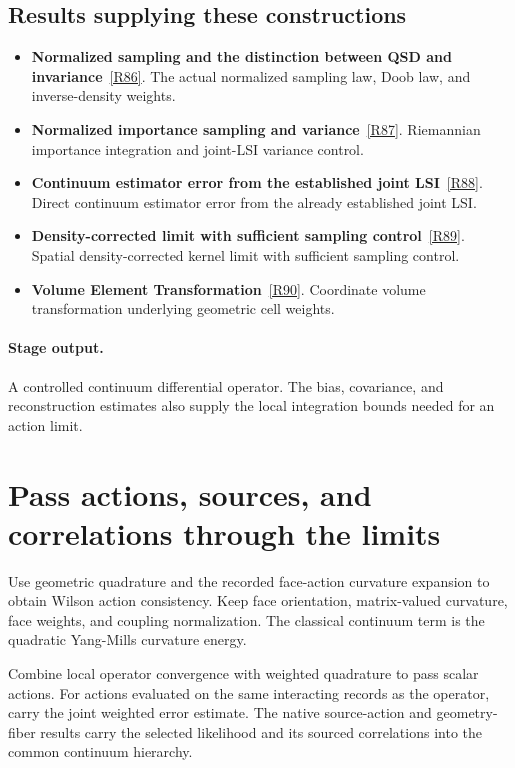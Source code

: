 \documentclass[11pt,a4paper]{article}
\begin{document}
\subsection*{Results supplying these constructions}
\begin{itemize}
\item \textbf{Normalized sampling and the distinction between QSD and invariance}~\hyperref[src:lem-continuum-a3-qsd-sampling]{[R86]}. The actual normalized sampling law, Doob law, and inverse-density weights.
\item \textbf{Normalized importance sampling and variance}~\hyperref[src:prop-monte-carlo-riemannian-latent]{[R87]}. Riemannian importance integration and joint-LSI variance control.
\item \textbf{Continuum estimator error from the established joint LSI}~\hyperref[src:cor-cst-inherited-lsi-consistency]{[R88]}. Direct continuum estimator error from the already established joint LSI.
\item \textbf{Density-corrected limit with sufficient sampling control}~\hyperref[src:prop-density-corrected-limit]{[R89]}. Spatial density-corrected kernel limit with sufficient sampling control.
\item \textbf{Volume Element Transformation}~\hyperref[src:thm-volume-element-transformation]{[R90]}. Coordinate volume transformation underlying geometric cell weights.
\end{itemize}
\paragraph{Stage output.} A controlled continuum differential operator. The bias, covariance, and reconstruction estimates also supply the local integration bounds needed for an action limit.

\section{Pass actions, sources, and correlations through the limits}
\label{stage:16}
Use geometric quadrature and the recorded face-action curvature expansion to obtain Wilson action consistency. Keep face orientation, matrix-valued curvature, face weights, and coupling normalization. The classical continuum term is the quadratic Yang-Mills curvature energy.

Combine local operator convergence with weighted quadrature to pass scalar actions. For actions evaluated on the same interacting records as the operator, carry the joint weighted error estimate. The native source-action and geometry-fiber results carry the selected likelihood and its sourced correlations into the common continuum hierarchy.
\end{document}
